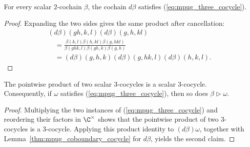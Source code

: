 \begin{lemma}
    \label{thm:mpug_coboundary_cocycle}
    \leanok
    For every scalar $2$-cochain $\beta$, the cochain $d\beta$ satisfies
    (\ref{eq:mpug_three_cocycle}).
\end{lemma}
\begin{proof}\leanok
    Expanding the two sides gives the same product after cancellation:
    \begin{align}
         & (d\beta)(gh,k,l)(d\beta)(g,h,kl)     \\
         & \quad =
        \frac{\beta(k,l)\beta(h,kl)\beta(g,hkl)}
        {\beta(ghk,l)\beta(gh,k)\beta(g,h)} \\
         & \quad =
        (d\beta)(g,h,k)(d\beta)(g,hk,l)(d\beta)(h,k,l).
    \end{align}
\end{proof}

\begin{lemma}
    \label{thm:mpug_gauge_preserves_cocycle}
    \leanok
    The pointwise product of two scalar $3$-cocycles is a scalar
    $3$-cocycle. Consequently, if $\omega$ satisfies
    (\ref{eq:mpug_three_cocycle}), then so does
    $\beta\mathbin{\triangleright}\omega$.
\end{lemma}
\begin{proof}\leanok
    Multiplying the two instances of (\ref{eq:mpug_three_cocycle}) and
    reordering their factors in $\C^\times$ shows that the pointwise product of
    two $3$-cocycles is a $3$-cocycle. Applying this product identity to
    $(d\beta)\omega$, together with Lemma~\ref{thm:mpug_coboundary_cocycle}
    for $d\beta$, yields the second claim.
\end{proof}

